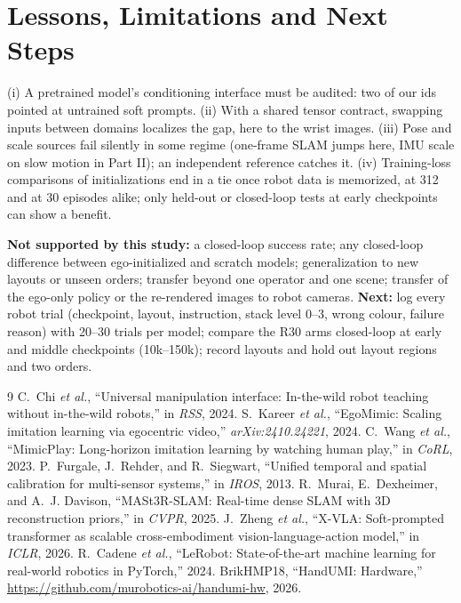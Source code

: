 \documentclass[conference,10pt]{IEEEtran}
\begin{document}
\section{Lessons, Limitations and Next Steps}
(i) A pretrained model's conditioning interface must be audited: two of our ids pointed at untrained soft prompts. (ii) With a
shared tensor contract, swapping inputs between domains localizes the gap, here to the wrist images. (iii) Pose and scale sources
fail silently in some regime (one-frame SLAM jumps here, IMU scale on slow motion in Part II); an independent reference catches it.
(iv) Training-loss comparisons of initializations end in a tie once robot data is memorized, at 312 and at 30 episodes alike;
only held-out or closed-loop tests at early checkpoints can show a benefit.

\textbf{Not supported by this study:} a closed-loop success rate; any closed-loop difference between ego-initialized and scratch
models; generalization to new layouts or unseen orders; transfer beyond one operator and one scene; transfer of the ego-only
policy or the re-rendered images to robot cameras. \textbf{Next:} log every robot trial (checkpoint, layout, instruction, stack
level 0--3, wrong colour, failure reason) with 20--30 trials per model; compare the R30 arms closed-loop at early and middle
checkpoints (10k--150k); record layouts and hold out layout regions and two orders.

\begin{thebibliography}{9}\footnotesize
{} C.~Chi \emph{et al.}, ``Universal manipulation interface: In-the-wild robot teaching without in-the-wild robots,'' in \emph{RSS}, 2024.
 S.~Kareer \emph{et al.}, ``EgoMimic: Scaling imitation learning via egocentric video,'' \emph{arXiv:2410.24221}, 2024.
 C.~Wang \emph{et al.}, ``MimicPlay: Long-horizon imitation learning by watching human play,'' in \emph{CoRL}, 2023.
 P.~Furgale, J.~Rehder, and R.~Siegwart, ``Unified temporal and spatial calibration for multi-sensor systems,'' in \emph{IROS}, 2013.
 R.~Murai, E.~Dexheimer, and A.~J. Davison, ``MASt3R-SLAM: Real-time dense SLAM with 3D reconstruction priors,'' in \emph{CVPR}, 2025.
 J.~Zheng \emph{et al.}, ``X-VLA: Soft-prompted transformer as scalable cross-embodiment vision-language-action model,'' in \emph{ICLR}, 2026.
 R.~Cadene \emph{et al.}, ``LeRobot: State-of-the-art machine learning for real-world robotics in PyTorch,'' 2024.
 BrikHMP18, ``HandUMI: Hardware,'' \url{https://github.com/murobotics-ai/handumi-hw}, 2026.
\end{thebibliography}
\end{document}
